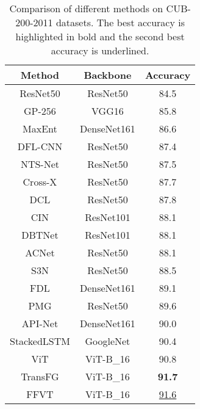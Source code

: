 \documentclass{bmvc2k}
\begin{document}
\begin{table}[!h]
\caption{Comparison of different methods on CUB-200-2011 datasets. The best accuracy is highlighted in bold and the second best accuracy is underlined.}
\centering
\begin{tabular}{c|c|c}
\toprule  
Method& Backbone& Accuracy \\
\hline
ResNet50 \cite{he2017weakly}&  ResNet50&  84.5\\
GP-256 \cite{wei2018grassmann}& VGG16 & 85.8\\
MaxEnt \cite{dubey2018maximum}& DenseNet161 & 86.6\\
DFL-CNN \cite{wang2018learning}&  ResNet50 & 87.4\\
NTS-Net \cite{yang2018learning}&  ResNet50 & 87.5\\
Cross-X \cite{luo2019cross}&  ResNet50 & 87.7\\
DCL \cite{chen2019destruction}&  ResNet50 & 87.8\\
CIN \cite{gao2020channel}&  ResNet101 & 88.1\\
DBTNet \cite{zheng2019learning}&  ResNet101 & 88.1\\
ACNet \cite{ji2020attention}&  ResNet50 & 88.1\\
S3N \cite{ding2019selective}&  ResNet50 & 88.5\\
FDL \cite{liu2020filtration}&  DenseNet161 & 89.1\\
PMG \cite{du2020fine}&  ResNet50 & 89.6\\
API-Net \cite{zhuang2020learning}&  DenseNet161 & 90.0\\
StackedLSTM \cite{ge2019weakly}&  GoogleNet & 90.4\\
\hline
ViT \cite{dosovitskiy2020image}&  ViT-B\_16&  90.8\\

TransFG \cite{he2021transfg}&  ViT-B\_16 &  \textbf{91.7}\\
FFVT&  ViT-B\_16 &  \underline{91.6}\\
\bottomrule 
\end{tabular}
\end{table}
\end{document}
